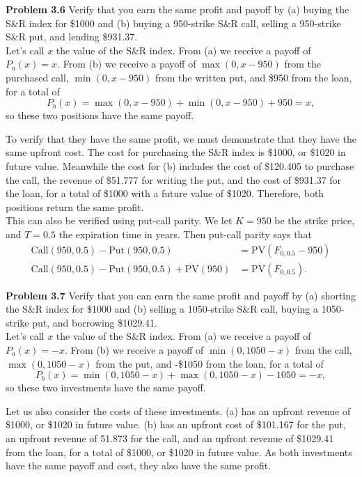 \documentclass[12pt]{article}
\newcommand{\problem}[1]{\bigskip \noindent \textbf{Problem #1}}
\newcommand{\Call}{\text{Call}}
\newcommand{\Put}{\text{Put}}
\newcommand{\PV}{\text{PV}}
\theoremstyle{plain}
\begin{document}
\problem{3.6} Verify that you earn the same profit and payoff by (a) buying the S\&R index for \$1000 and (b) buying a 950-strike S\&R call, selling a 950-strike S\&R put, and lending \$931.37.\\

Let's call $x$ the value of the S\&R index. From (a) we receive a payoff of $P_a(x) = x$. From (b) we receive a payoff of $\max(0,x-950)$ from the purchased call, $\min(0,x-950)$ from the written put, and \$950 from the loan, for a total of 
\[
P_b(x) = \max(0,x-950) + \min(0,x-950) + 950 = x,
\]
so these two positions have the same payoff. 

To verify that they have the same profit, we must demonstrate that they have the same upfront cost. The cost for purchasing the S\&R index is \$1000, or \$1020 in future value. Meanwhile the cost for (b) includes the cost of \$120.405 to purchase the call, the revenue of \$51.777 for writing the put, and the cost of \$931.37 for the loan, for a total of \$1000 with a future value of \$1020. Therefore, both positions return the same profit.\\

This can also be verified using put-call parity. We let $K = 950$ be the strike price, and $T = 0.5$ the expiration time in years. Then put-call parity says that
\begin{align*}
\Call(950,0.5) - \Put(950,0.5) &= \PV(F_{0,0.5} - 950)\\
\Call(950,0.5) - \Put(950,0.5) + \PV(950) &= \PV(F_{0,0.5}).
\end{align*}

\problem{3.7} Verify that you can earn the same profit and payoff by (a) shorting the S\&R index for \$1000 and (b) selling a 1050-strike S\&R call, buying a 1050-strike put, and borrowing \$1029.41.\\

Let's call $x$ the value of the S\&R index. From (a) we receive a payoff of $P_a(x) = -x$. From (b) we receive a payoff of $\min(0,1050-x)$ from the call, $\max(0,1050-x)$ from the put, and -\$1050 from the loan, for a total of
\[
P_b(x) = \min(0,1050-x) + \max(0,1050-x) - 1050 = -x,
\]
so these two investments have the same payoff.

Let us also consider the costs of these investments. (a) has an upfront revenue of \$1000, or \$1020 in future value. (b) has an upfront cost of \$101.167 for the put, an upfront revenue of 51.873 for the call, and an upfront revenue of \$1029.41 from the loan, for a total of \$1000, or \$1020 in future value. As both investments have the same payoff and cost, they also have the same profit.\\
\end{document}
